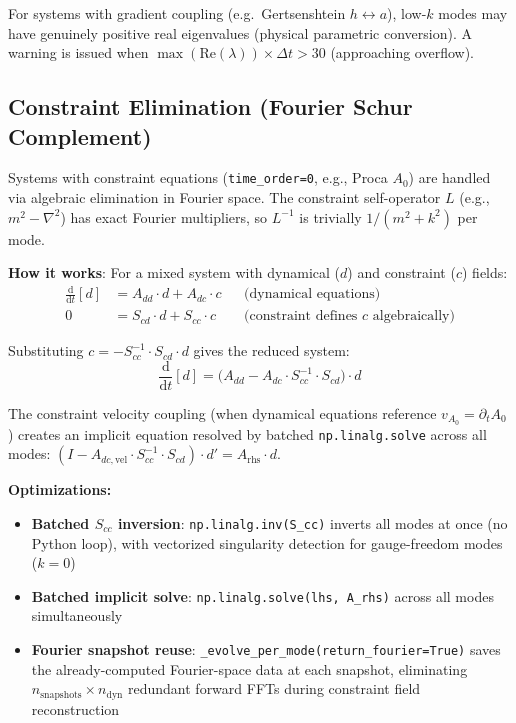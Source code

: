 For systems with gradient coupling (e.g.\ Gertsenshtein $h \leftrightarrow a$), low-$k$ modes may have genuinely positive real eigenvalues (physical parametric conversion). A warning is issued when $\max(\mathrm{Re}(\lambda)) \times \Delta t > 30$ (approaching overflow).

\subsection{Constraint Elimination (Fourier Schur Complement)}
\label{sec:modal-constraint-elimination}

Systems with constraint equations (\texttt{time\_order=0}, e.g., Proca $A_0$) are handled via algebraic elimination in Fourier space. The constraint self-operator $L$ (e.g., $m^2 - \nabla^2$) has exact Fourier multipliers, so $L^{-1}$ is trivially $1/(m^2 + k^2)$ per mode.

\textbf{How it works}: For a mixed system with dynamical ($d$) and constraint ($c$) fields:
\begin{align}
  \frac{\mathrm{d}}{\mathrm{d}t}[d] &= A_{dd} \cdot d + A_{dc} \cdot c & &\text{(dynamical equations)} \label{eq:schur-dyn} \\
  0 &= S_{cd} \cdot d + S_{cc} \cdot c & &\text{(constraint defines $c$ algebraically)} \label{eq:schur-con}
\end{align}

Substituting $c = -S_{cc}^{-1} \cdot S_{cd} \cdot d$ gives the reduced system:
\begin{equation}
  \frac{\mathrm{d}}{\mathrm{d}t}[d] = \bigl(A_{dd} - A_{dc} \cdot S_{cc}^{-1} \cdot S_{cd}\bigr) \cdot d
  \label{eq:schur-reduced}
\end{equation}

The constraint velocity coupling (when dynamical equations reference $v_{A_0} = \partial_t A_0$) creates an implicit equation resolved by batched \texttt{np.linalg.solve} across all modes: $(I - A_{dc,\text{vel}} \cdot S_{cc}^{-1} \cdot S_{cd}) \cdot d' = A_\text{rhs} \cdot d$.

\textbf{Optimizations:}
\begin{itemize}
  \item \textbf{Batched $S_{cc}$ inversion}: \texttt{np.linalg.inv(S\_cc)} inverts all modes at once (no Python loop), with vectorized singularity detection for gauge-freedom modes ($k=0$)
  \item \textbf{Batched implicit solve}: \texttt{np.linalg.solve(lhs, A\_rhs)} across all modes simultaneously
  \item \textbf{Fourier snapshot reuse}: \texttt{\_evolve\_per\_mode(return\_fourier=True)} saves the already-computed Fourier-space data at each snapshot, eliminating $n_\text{snapshots} \times n_\text{dyn}$ redundant forward FFTs during constraint field reconstruction
\end{itemize}

